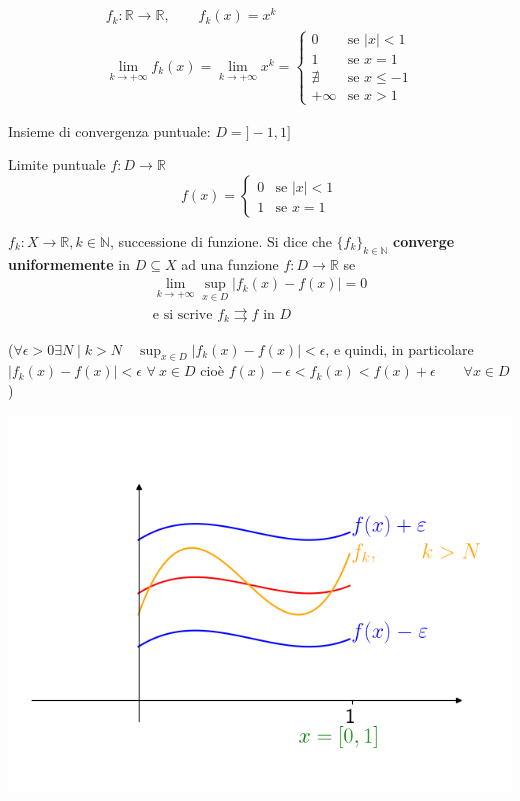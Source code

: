 \begin{exbar}
	\begin{gather*}
	f_k: \mathbb{R} \rightarrow \mathbb{R}, \qquad f_k(x) = x^k
	\\
	\lim_{k \rightarrow + \infty} f_k(x) = \lim_{k \rightarrow + \infty} x^k =
	\begin{cases}
		0 & \text{se } |x|<1
		\\
		1 & \text{se } x=1 
		\\
		\nexists & \text{se } x \leq -1
		\\
		+\infty & \text{se } x >1
	\end{cases}
	\end{gather*}
	
	Insieme di convergenza puntuale: $D = ]-1,1]$
	
	Limite puntuale $f:D \rightarrow \mathbb{R}$		
	\begin{equation*} f(x) = \begin{cases}
		0 & \text{se } |x|<1
		\\
		1 & \text{se } x=1
	\end{cases}
	\end{equation*}	
\end{exbar}


\begin{definition}
	$f_k:X \rightarrow \mathbb{R}, k \in \mathbb{N}$, successione di funzione. Si dice che $\{ f_k \}_{k \in \mathbb{N} }$ \textbf{converge uniformemente} in $D \subseteq X$ ad una funzione $f: D \rightarrow \mathbb{R}$ se 
	\begin{gather*}
		\lim_{k \rightarrow +\infty} \sup_{x \in D} |f_k(x) - f(x)| = 0 
		\\
		\text{e si scrive } f_k \rightrightarrows f \text{ in } D
	\end{gather*}
	
	($\forall \epsilon >0 \exists N \; \big| \; k >N \quad \sup_{x \in D} |f_k(x)-f(x)| < \epsilon$, e quindi, in particolare $|f_k(x) - f(x)| < \epsilon$ $\forall \ x \in D$ cioè $f(x) - \epsilon <f_k(x) < f(x) + \epsilon \qquad \forall x \in D$)
	
	\begin{center}
		\includegraphics[width=0.7\linewidth]{spazi_metrici_e_normati/pag184}
		\label{fig:pag184}
	\end{center}
\end{definition}


